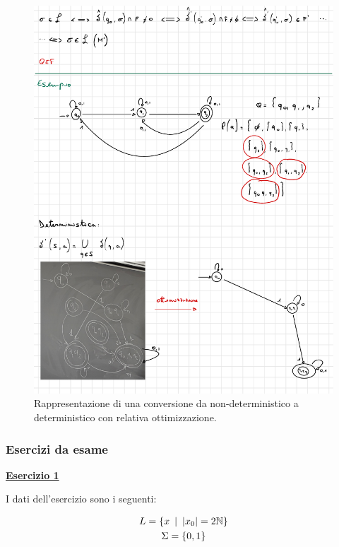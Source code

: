\documentclass[a4paper]{article}
\begin{document}
	\begin{figure}[!htp]
		\centering
		\includegraphics[width=1\textwidth]{img/grafo_ex2-sol.pdf}
		\caption{Rappresentazione di una conversione da non-deterministico a deterministico con relativa ottimizzazione.}
	\end{figure}

	\newpage
	
	\subsubsection[\textcolor{Red3}{Esercizi da esame}]{Esercizi da esame}\label{Esercizi da esame - ASFD / linguaggi regolari}
	
	\textcolor{Red3}{\textbf{\underline{Esercizio 1}}}\newline
	
	\noindent
	I dati dell'esercizio sono i seguenti:
	
	\begin{gather*}
		L = \left\{x \hspace{0.5em} | \hspace{0.5em} |x_{0}| = 2\mathbb{N}\right\} \\
		\Sigma = \left\{0, 1\right\}
	\end{gather*}\newline
	
\end{document}
